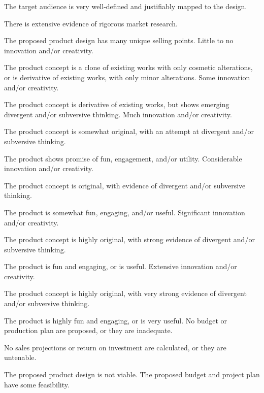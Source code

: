 \documentclass{../fal_assignment}
\begin{document}
\begin{markingrubric}
        \grade The target audience is very well-defined and justifiably mapped to the design.
            \par There is extensive evidence of rigorous market research.
            \par The proposed product design has many unique selling points.
%
        \grade\fail Little to no innovation and/or creativity.
            \par The product concept is a clone of existing works with only cosmetic alterations, or is derivative of existing works, with only minor alterations.
        \grade Some innovation and/or creativity.
            \par The product concept is derivative of existing works, but shows emerging divergent and/or subversive thinking.
        \grade Much innovation and/or creativity.
            \par The product concept is somewhat original, with an attempt at divergent and/or subversive thinking.
            \par The product shows promise of fun, engagement, and/or utility.
        \grade Considerable innovation and/or creativity.
            \par The product concept is original, with evidence of divergent and/or subversive thinking.
            \par The product is somewhat fun, engaging, and/or useful.
        \grade Significant innovation and/or creativity.
            \par The product concept is highly original, with strong evidence of divergent and/or subversive thinking.
            \par The product is fun and engaging, or is useful.
        \grade Extensive innovation and/or creativity.
            \par The product concept is highly original, with very strong evidence of divergent and/or subversive thinking.
            \par The product is highly fun and engaging, or is very useful.
%
        \grade\fail No budget or production plan are proposed, or they are inadequate.
            \par No sales projections or return on investment are calculated, or they are untenable.
            \par The proposed product design is not viable.
        \grade The proposed budget and project plan have some feasibility.

\end{markingrubric}
\end{document}
